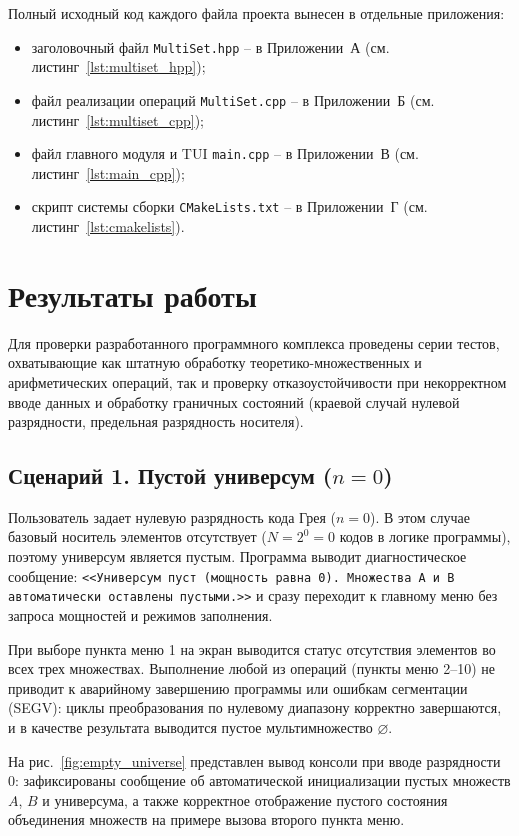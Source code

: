 \documentclass[14pt, a4paper]{extarticle}
\begin{document}
	Полный исходный код каждого файла проекта вынесен в отдельные приложения:
	\begin{itemize}
		\item заголовочный файл \texttt{MultiSet.hpp} -- в Приложении~А (см. листинг~\ref{lst:multiset_hpp});
		\item файл реализации операций \texttt{MultiSet.cpp} -- в Приложении~Б (см. листинг~\ref{lst:multiset_cpp});
		\item файл главного модуля и TUI \texttt{main.cpp} -- в Приложении~В (см. листинг~\ref{lst:main_cpp});
		\item скрипт системы сборки \texttt{CMakeLists.txt} -- в Приложении~Г (см. листинг~\ref{lst:cmakelists}).
	\end{itemize}
	
	\newpage
	\section{Результаты работы}
	
	Для проверки разработанного программного комплекса проведены серии тестов, охватывающие как штатную обработку теоретико-множественных и арифметических операций, так и проверку отказоустойчивости при некорректном вводе данных и обработку граничных состояний (краевой случай нулевой разрядности, предельная разрядность носителя).
	
	\subsection{Сценарий 1. Пустой универсум ($n = 0$)}
	
	Пользователь задает нулевую разрядность кода Грея ($n = 0$). В этом случае базовый носитель элементов отсутствует ($N = 2^0 = 0$ кодов в логике программы), поэтому универсум является пустым. Программа выводит диагностическое сообщение: \texttt{<<Универсум пуст (мощность равна 0). Множества A и B автоматически оставлены пустыми.>>} и сразу переходит к главному меню без запроса мощностей и режимов заполнения.
	
	При выборе пункта меню 1 на экран выводится статус отсутствия элементов во всех трех множествах. Выполнение любой из операций (пункты меню 2--10) не приводит к аварийному завершению программы или ошибкам сегментации (SEGV): циклы преобразования по нулевому диапазону корректно завершаются, и в качестве результата выводится пустое мультимножество $\varnothing$.
		
	На рис.~\ref{fig:empty_universe} представлен вывод консоли при вводе разрядности 0: зафиксированы сообщение об автоматической инициализации пустых множеств $A$, $B$ и универсума, а также корректное отображение пустого состояния объединения множеств на примере вызова второго пункта меню.
	
\end{document}
